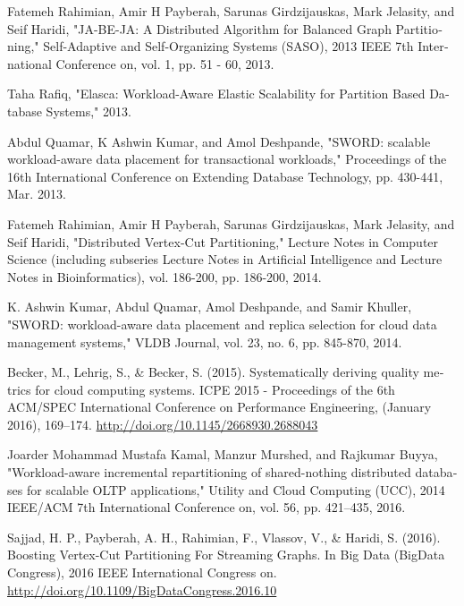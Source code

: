 \begin{thebibliography}{9}
\begin{latin}
		 Fatemeh Rahimian, Amir H Payberah, Sarunas Girdzijauskas, Mark Jelasity, and Seif Haridi, "JA-BE-JA: A Distributed Algorithm for Balanced Graph Partitioning," Self-Adaptive and Self-Organizing Systems (SASO), 2013 IEEE 7th International Conference on, vol. 1, pp. 51 - 60, 2013.

		 Taha Rafiq, "Elasca: Workload-Aware Elastic Scalability for Partition Based Database Systems," 2013.

		 Abdul Quamar, K Ashwin Kumar, and Amol Deshpande, "SWORD: scalable workload-aware data placement for transactional workloads," Proceedings of the 16th International Conference on Extending Database Technology, pp. 430-441, Mar. 2013.
		
		 Fatemeh Rahimian, Amir H Payberah, Sarunas Girdzijauskas, Mark Jelasity, and Seif Haridi, "Distributed Vertex-Cut Partitioning," Lecture Notes in Computer Science (including subseries Lecture Notes in Artificial Intelligence and Lecture Notes in Bioinformatics), vol. 186-200, pp. 186-200, 2014.

		 K. Ashwin Kumar, Abdul Quamar, Amol Deshpande, and Samir Khuller, "SWORD: workload-aware data placement and replica selection for cloud data management systems," VLDB Journal, vol. 23, no. 6, pp. 845-870, 2014.

		
		 Becker, M., Lehrig, S., \& Becker, S. (2015). Systematically deriving quality metrics for cloud computing systems. ICPE 2015 - Proceedings of the 6th ACM/SPEC International Conference on Performance Engineering, (January 2016), 169–174. \href{http://doi.org/10.1145/2668930.2688043}{http://doi.org/10.1145/2668930.2688043}
		
		 Joarder Mohammad Mustafa Kamal, Manzur Murshed, and Rajkumar Buyya, "Workload-aware incremental repartitioning of shared-nothing distributed databases for scalable OLTP applications," Utility and Cloud Computing (UCC), 2014 IEEE/ACM 7th International Conference on, vol. 56, pp. 421–435, 2016.
		
		 Sajjad, H. P., Payberah, A. H., Rahimian, F., Vlassov, V., \& Haridi, S. (2016). Boosting Vertex-Cut Partitioning For Streaming Graphs. In Big Data (BigData Congress), 2016 IEEE International Congress on. \href{http://doi.org/10.1109/BigDataCongress.2016.10}{http://doi.org/10.1109/BigDataCongress.2016.10}
		

\end{latin}
\end{thebibliography}
